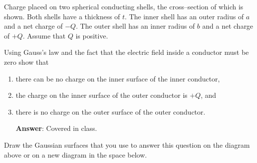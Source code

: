 \documentclass{article}
\begin{document}
Charge placed on two spherical conducting shells, the cross--section of which is shown. Both shells have a thickness of $t$. The inner shell has an outer radius of $a$ and a net charge of $-Q$. The outer shell has an inner radius of $b$ and a net charge of $+Q$. Assume that $Q$ is positive.



Using Gauss's law and the fact that the electric field inside a conductor must be zero show that

\begin{enumerate}

  \item there can be no charge on the inner surface of the inner conductor,

  \item the charge on the inner surface of the outer conductor is $+Q$, and

  \item there is no charge on the outer surface of the outer conductor.

     \ifsolutions
       \textbf{Answer}: Covered in class.
     \fi

\end{enumerate}

Draw the Gaussian surfaces that you use to answer this question on the diagram above or on a new diagram in the space below.

\ifsolutions\else
\newpage
\fi
\end{document}

